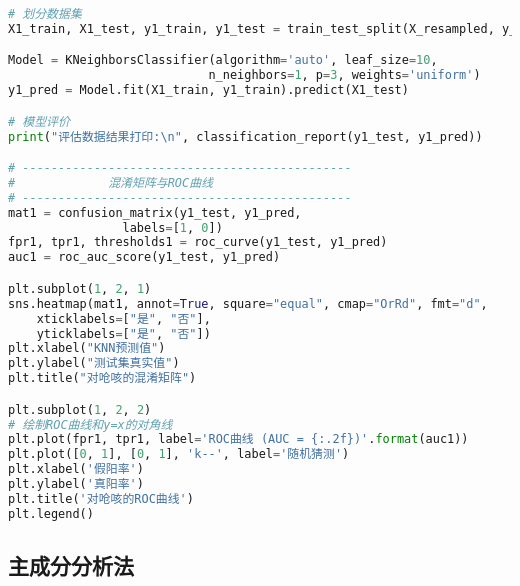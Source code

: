 \begin{lstlisting}[language=Python]
# 划分数据集
X1_train, X1_test, y1_train, y1_test = train_test_split(X_resampled, y_resampled, test_size=0.2, random_state=0)

Model = KNeighborsClassifier(algorithm='auto', leaf_size=10, 
                            n_neighbors=1, p=3, weights='uniform')
y1_pred = Model.fit(X1_train, y1_train).predict(X1_test)

# 模型评价
print("评估数据结果打印:\n", classification_report(y1_test, y1_pred))

# ----------------------------------------------
#             混淆矩阵与ROC曲线
# ----------------------------------------------
mat1 = confusion_matrix(y1_test, y1_pred, 
                labels=[1, 0])
fpr1, tpr1, thresholds1 = roc_curve(y1_test, y1_pred)
auc1 = roc_auc_score(y1_test, y1_pred)

plt.subplot(1, 2, 1)
sns.heatmap(mat1, annot=True, square="equal", cmap="OrRd", fmt="d",
    xticklabels=["是", "否"], 
    yticklabels=["是", "否"])
plt.xlabel("KNN预测值")
plt.ylabel("测试集真实值")
plt.title("对呛咳的混淆矩阵")

plt.subplot(1, 2, 2)
# 绘制ROC曲线和y=x的对角线
plt.plot(fpr1, tpr1, label='ROC曲线 (AUC = {:.2f})'.format(auc1))
plt.plot([0, 1], [0, 1], 'k--', label='随机猜测')
plt.xlabel('假阳率')
plt.ylabel('真阳率')
plt.title('对呛咳的ROC曲线')
plt.legend()
\end{lstlisting}


\subsection{主成分分析法}

